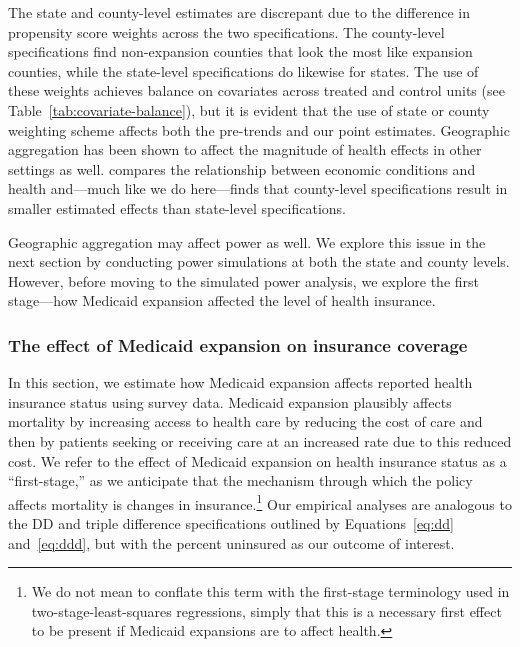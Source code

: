 \documentclass[12pt]{article}%
\begin{document}
The state and county-level estimates are discrepant due to the difference in propensity score weights across the two specifications. 
The county-level specifications find non-expansion counties that look the most like expansion counties, while the state-level specifications do likewise for states. 
The use of these weights achieves balance on covariates across treated and control units (see Table~\ref{tab:covariate-balance}), but it is evident that the use of state or county weighting scheme affects both the pre-trends and our point estimates. 
Geographic aggregation has been shown to affect the magnitude of health effects in other settings as well. 
\citet{lindoAggregationEstimatedEffects2015} compares the relationship between economic conditions and health and---much like we do here---finds that county-level specifications result in smaller estimated effects than state-level specifications. 


Geographic aggregation may affect power as well. 
We explore this issue in the next section by conducting power simulations at both the state and county levels. 
However, before moving to the simulated power analysis, we explore the first stage---how Medicaid expansion affected the level of health insurance.   

\subsubsection{The effect of Medicaid expansion on insurance coverage}
\label{sec:first-stage}

  In this section, we estimate how Medicaid expansion affects reported health insurance status using survey data. 
  Medicaid expansion plausibly affects mortality by increasing access to health care by reducing the cost of care and then by patients seeking or receiving care at an increased rate due to this reduced cost. 
  We refer to the effect of Medicaid expansion on health insurance status as a ``first-stage,'' as we anticipate that the mechanism through which the policy affects mortality is changes in insurance.\footnote{We do not mean to conflate this term with the first-stage terminology used in two-stage-least-squares regressions, simply that this is a necessary first effect to be present if Medicaid expansions are to affect health.}
  Our empirical analyses are analogous to the DD and triple difference specifications outlined by Equations~\ref{eq:dd} and~\ref{eq:ddd}, but with the percent uninsured as our outcome of interest.
\end{document}
